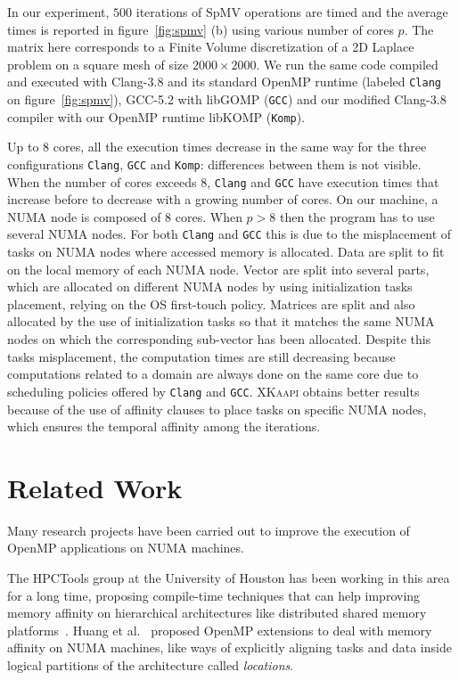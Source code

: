 \documentclass{Styles/llncs}
\newcommand{\kaapi}{\textsc{\mbox{XKaapi}}\xspace}
\begin{document}
In our experiment, $500$ iterations of SpMV operations are timed and the average times is reported in figure~\ref{fig:spmv} (b)  using various number of cores $p$. The matrix here corresponds to a  Finite Volume discretization of a 2D Laplace problem on a square mesh of size $2000\times 2000$.
We run the same code compiled and executed with Clang-3.8 and its standard OpenMP runtime (labeled  \texttt{Clang} on figure~\ref{fig:spmv}), GCC-5.2 with libGOMP (\texttt{GCC}) and our modified Clang-3.8 compiler with our OpenMP runtime libKOMP (\texttt{Komp}).

Up to 8 cores, all the execution times decrease in the same way for the three configurations \texttt{Clang}, \texttt{GCC} and \texttt{Komp}: differences between them is not visible.
When the number of cores exceeds $8$, \texttt{Clang} and \texttt{GCC} have execution times that increase before to decrease with a growing number of cores.
On our machine, a NUMA node is composed of $8$ cores. When $p >8$ then the program has to use several NUMA nodes. For both \texttt{Clang} and \texttt{GCC} this is due to the misplacement of tasks on NUMA nodes where accessed memory is allocated.
Data are split to fit on the local memory of each NUMA node. Vector are split into several parts, which are allocated on different NUMA nodes by using initialization tasks placement, relying on the OS first-touch policy.
Matrices are split and also allocated by the use of initialization tasks so that it matches the
same NUMA nodes on which the corresponding sub-vector has been allocated.
Despite this tasks misplacement, the computation times are still decreasing because computations related to a domain are always done on the same core due to scheduling policies offered by \texttt{Clang} and \texttt{GCC}.
\kaapi obtains better results because of the use of affinity clauses to place tasks on specific NUMA nodes, which ensures the temporal affinity among the iterations.


\section{Related Work}
\label{sec:related_work}

Many research projects have been carried out to improve the execution of
OpenMP applications on NUMA machines.

The HPCTools group at the University of Houston has been working in
this area for a long time, proposing compile-time techniques that can
help improving memory affinity on hierarchical architectures like
distributed shared memory
platforms~\cite{Marowka:2004:OAD:1064428.1064431}. Huang et
al.~\cite{Huang-Chapman-locality-OpenMP} proposed OpenMP extensions to
deal with memory affinity on NUMA machines, like ways of explicitly
aligning tasks and data inside logical partitions of the architecture
called \textit{locations}.
\end{document}
